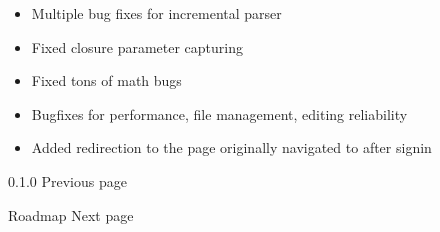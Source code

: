 \begin{itemize}
  \begin{itemize}
  \tightlist
  \item
    Multiple bug fixes for incremental parser
  \item
    Fixed closure parameter capturing
  \item
    Fixed tons of math bugs
  \item
    Bugfixes for performance, file management, editing reliability
  \item
    Added redirection to the page originally navigated to after signin
  \end{itemize}
\end{itemize}

\href{/docs/changelog/0.1.0/}{\pandocbounded{}}

{ 0.1.0 } { Previous page }

\href{/docs/roadmap/}{\pandocbounded{}}

{ Roadmap } { Next page }
